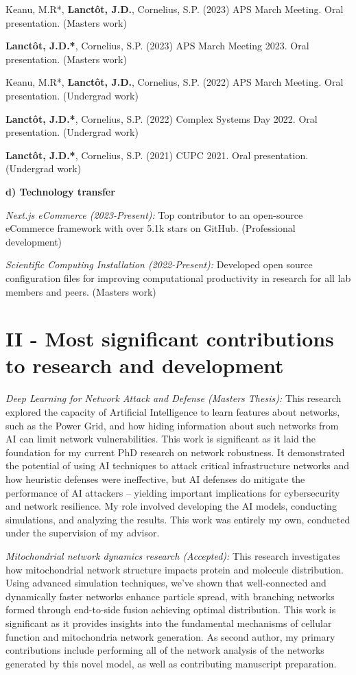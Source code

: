 \begin{contributions}
Keanu, M.R*, \textbf{Lanct\^{o}t, J.D.}, Cornelius, S.P. (2023) APS March Meeting. Oral presentation. (Masters work)

\textbf{Lanct\^{o}t, J.D.*}, Cornelius, S.P. (2023) APS March Meeting 2023. Oral presentation. (Masters work)

Keanu, M.R*, \textbf{Lanct\^{o}t, J.D.}, Cornelius, S.P. (2022) APS March Meeting. Oral presentation. (Undergrad work)

\textbf{Lanct\^{o}t, J.D.*}, Cornelius, S.P. (2022) Complex Systems Day 2022. Oral presentation. (Undergrad work)

\textbf{Lanct\^{o}t, J.D.*}, Cornelius, S.P. (2021) CUPC 2021. Oral presentation. (Undergrad work)

\textbf{d) Technology transfer}

\vspace{-0.6em}
\textit{Next.js eCommerce (2023-Present):} Top contributor to an open-source eCommerce framework with over 5.1k stars on GitHub. (Professional development)

\textit{Scientific Computing Installation (2022-Present):} Developed open source configuration files for improving computational productivity in research for all lab members and peers. (Masters work)

\section*{II - Most significant contributions to research and development}
\vspace{-1.5em}
\textit{Deep Learning for Network Attack and Defense (Masters Thesis):} This research explored the capacity of Artificial Intelligence to learn features about networks, such as the Power Grid, and how hiding information about such networks from AI can limit network vulnerabilities. This work is significant as it laid the foundation for my current PhD research on network robustness. It demonstrated the potential of using AI techniques to attack critical infrastructure networks and how heuristic defenses were ineffective, but AI defenses do mitigate the performance of AI attackers -- yielding important implications for cybersecurity and network resilience. My role involved developing the AI models, conducting simulations, and analyzing the results. This work was entirely my own, conducted under the supervision of my advisor.

\textit{Mitochondrial network dynamics research (Accepted):} This research investigates how mitochondrial network structure impacts protein and molecule distribution. Using advanced simulation techniques, we've shown that well-connected and dynamically faster networks enhance particle spread, with branching networks formed through end-to-side fusion achieving optimal distribution. This work is significant as it provides insights into the fundamental mechanisms of cellular function and mitochondria network generation. As second author, my primary contributions include performing all of the network analysis of the networks generated by this novel model, as well as contributing manuscript preparation.


\end{contributions}
